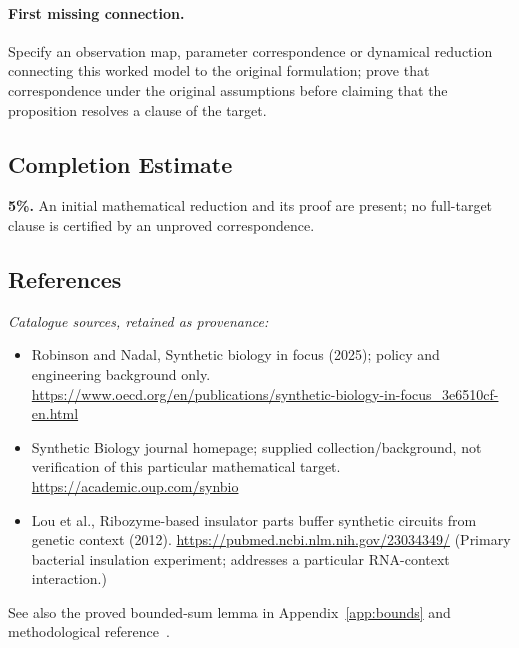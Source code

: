 \documentclass[11pt]{article}
\begin{document}
\paragraph{First missing connection.} Specify an observation map, parameter correspondence or dynamical reduction connecting this worked model to the original formulation; prove that correspondence under the original assumptions before claiming that the proposition resolves a clause of the target.
\subsection{Completion Estimate}
\textbf{5\%.} An initial mathematical reduction and its proof are present; no full-target clause is certified by an unproved correspondence.
\subsection{References}
\noindent\emph{Catalogue sources, retained as provenance:}
\begin{itemize}
\item Robinson and Nadal, Synthetic biology in focus (2025); policy and engineering background only. \url{https://www.oecd.org/en/publications/synthetic-biology-in-focus_3e6510cf-en.html}
\item Synthetic Biology journal homepage; supplied collection/background, not verification of this particular mathematical target. \url{https://academic.oup.com/synbio}
\item Lou et al., Ribozyme-based insulator parts buffer synthetic circuits from genetic context (2012). \url{https://pubmed.ncbi.nlm.nih.gov/23034349/} (Primary bacterial insulation experiment; addresses a particular RNA-context interaction.)
\end{itemize}
\noindent See also the proved bounded-sum lemma in Appendix~\ref{app:bounds} and methodological reference~\cite{hoeffding}.
\clearpage


\appendix
\end{document}
